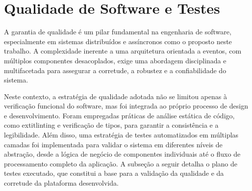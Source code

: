 \section{Qualidade de Software e Testes}
\label{sec:qualidade}

A garantia de qualidade é um pilar fundamental na engenharia de software, especialmente em sistemas distribuídos e assíncronos como o proposto neste trabalho. A complexidade inerente a uma arquitetura orientada a eventos, com múltiplos componentes desacoplados, exige uma abordagem disciplinada e multifacetada para assegurar a corretude, a robustez e a confiabilidade do sistema.

Neste contexto, a estratégia de qualidade adotada não se limitou apenas à verificação funcional do software, mas foi integrada ao próprio processo de design e desenvolvimento. Foram empregadas práticas de análise estática de código, como 	extit{linting} e verificação de tipos, para garantir a consistência e a legibilidade. Além disso, uma estratégia de testes automatizados em múltiplas camadas foi implementada para validar o sistema em diferentes níveis de abstração, desde a lógica de negócio de componentes individuais até o fluxo de processamento completo da aplicação. A subseção a seguir detalha o plano de testes executado, que constitui a base para a validação da qualidade e da corretude da plataforma desenvolvida.
